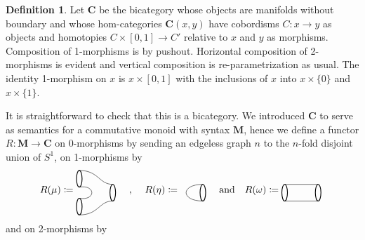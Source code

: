 \documentclass[11pt]{amsart}
\newcommand{\cat}[1]{\mathbf{#1}}
\renewcommand{\t}[1]{\textup{#1}}
\newcommand{\from}{\colon}
\theoremstyle{remark}
\theoremstyle{definition}
\newtheorem{defn}[thm]{Definition}
\begin{document}
\begin{defn}
	Let $\cat{C}$ be the bicategory 
	whose objects are 
	manifolds without boundary and 
	whose hom-categories $\cat{C}(x,y)$ 
	have cobordisms $C \from x \to y$ as objects 
	and homotopies $C \times [0,1] \to C'$ 
	relative to $x$ and $y$ as morphisms. 
	Composition of 1-morphisms is by pushout.  
	Horizontal composition of 2-morphisms 
	is evident and 
	vertical composition is 
	re-parametrization as usual. 
	The identity 1-morphism on 
	$x$ is $x \times [0,1]$ with the 
	inclusions of $x$ into 
	$x \times \{ 0 \}$ and $x \times \{ 1 \}$.  
\end{defn}  

It is straightforward to check 
that this is a bicategory. 
We introduced $\cat{C}$ to 
serve as semantics for a 
commutative monoid with 
syntax $\cat{M}$, 
hence we define a functor 
	$R \from \cat{M} \to \cat{C}$ on 
0-morphisms by sending an 
edgeless graph $n$ to the 
$n$-fold disjoint union of $S^1$, 
on 1-morphisms by 
\[
R(\mu) \coloneqq
\raisebox{-0.5\height}{%
	\begin{tikzpicture}
		\draw [thick]  (1.6,-0.2) ellipse (0.1 and 0.3);
	\draw [thick]  (0.4,0.3) ellipse (0.1 and 0.3);
	\draw [thick] (0.4,-0.7) ellipse (0.1 and 0.3);
	\draw (0.4,0) .. controls (1,0.1) and (1,-0.5) .. (0.4,-0.4);
	\draw (0.4,0.6) .. controls (1.1,0.6) and (1.1,0.1) .. (1.6,0.1);
	\draw (0.4,-1) .. controls (1.1,-1) and (1.1,-0.5) .. (1.6,-0.5);
	\end{tikzpicture}
}
	\quad
	\t{, }
	\quad
R(\eta) \coloneqq
\raisebox{-0.5\height}{%
	\begin{tikzpicture}
	\draw [thick]  (0,0) ellipse (0.1 and 0.3);
	\draw (0,0.3) .. controls (-0.8,0.3) and (-0.8,-0.3) .. (0,-0.3);
	\end{tikzpicture}
}
%
%
%
\quad
\t{and}
\quad
%
%
%
R(\omega) \coloneqq
\raisebox{-0.5\height}{%
	\begin{tikzpicture}
	\draw [thick]  (1.6,-0.2) ellipse (0.1 and 0.3);
	\draw [thick] (0.4,-0.2) ellipse (0.1 and 0.3);
	\draw (0.4,0.1) -- (1.6,0.1);
	\draw (0.4,-0.5) -- (1.6,-0.5);
	\end{tikzpicture}
}
\]
and on 2-morphisms by 
\end{document}
